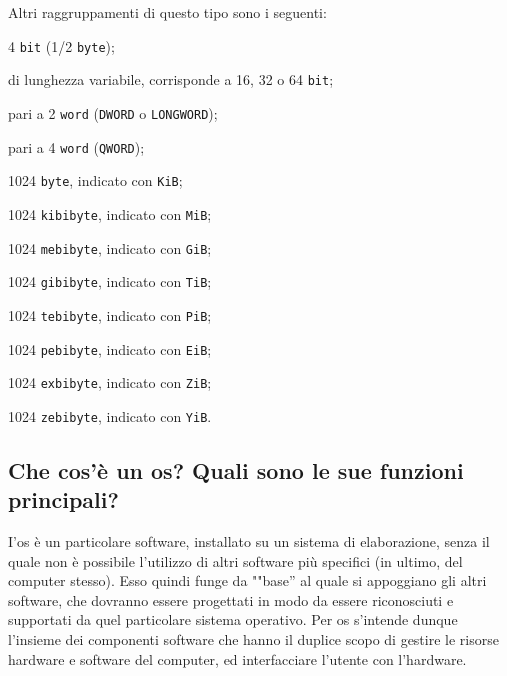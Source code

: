 Altri  raggruppamenti di questo tipo sono i seguenti:
\begin{description}[]
	\item[Nibble:] 4 \lstinline!bit! (1/2 \lstinline!byte!);
	\item[Word:] di lunghezza variabile, corrisponde a 16, 32 o 64 \lstinline!bit!;
	\item[Double Word:] pari a 2 \lstinline!word! (\lstinline!DWORD! o \lstinline!LONGWORD!);
	\item[Quad Word:] pari a 4 \lstinline!word! (\lstinline!QWORD!);
	\item[Kibibyte:] 1024 \lstinline!byte!, indicato con \lstinline!KiB!;
	\item[Mebibyte:] 1024 \lstinline!kibibyte!, indicato con \lstinline!MiB!;
	\item[Gibibyte:] 1024 \lstinline!mebibyte!, indicato con \lstinline!GiB!;
	\item[Tebibyte:] 1024 \lstinline!gibibyte!, indicato con \lstinline!TiB!;
	\item[Pebibyte:] 1024 \lstinline!tebibyte!, indicato con \lstinline!PiB!;
	\item[Exbibyte:] 1024 \lstinline!pebibyte!, indicato con \lstinline!EiB!;
	\item[Zebibyte:] 1024 \lstinline!exbibyte!, indicato con \lstinline!ZiB!;
	\item[Yobibyte:] 1024 \lstinline!zebibyte!, indicato con \lstinline!YiB!.
\end{description}

	\subsection{Che cos'è un \acs{os}? Quali sono le sue funzioni principali?}
	\label{subsec:sis}

I'\ac{os} è un particolare software, installato su un sistema di elaborazione, senza il quale non è possibile l'utilizzo di altri software più specifici (in ultimo, del computer stesso). Esso quindi funge da ""base'' al quale si appoggiano gli altri software, che dovranno essere progettati in modo da essere riconosciuti e supportati da quel particolare sistema operativo. Per  \ac{os} s'intende dunque l'insieme dei componenti software che hanno il duplice scopo di gestire le risorse hardware e software del computer, ed interfacciare l'utente con l'hardware.

